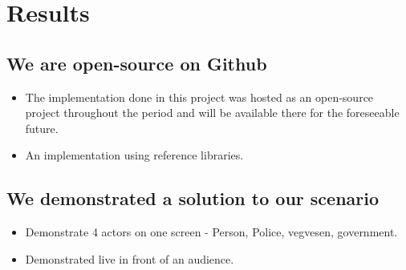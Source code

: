 \hypertarget{results}{%
\chapter{Results}\label{results}}

\hypertarget{we-are-open-source-on-github}{%
\section{We are open-source on
Github}\label{we-are-open-source-on-github}}

\begin{itemize}
\tightlist
\item
  The implementation done in this project was hosted as an open-source
  project throughout the period and will be available there for the
  foreseeable future.
\item
  An implementation using reference libraries.
\end{itemize}

\hypertarget{we-demonstrated-a-solution-to-our-scenario}{%
\section{We demonstrated a solution to our
scenario}\label{we-demonstrated-a-solution-to-our-scenario}}

\begin{itemize}
\tightlist
\item
  Demonstrate 4 actors on one screen - Person, Police, vegvesen,
  government.
\item
  Demonstrated live in front of an audience.
\end{itemize}
